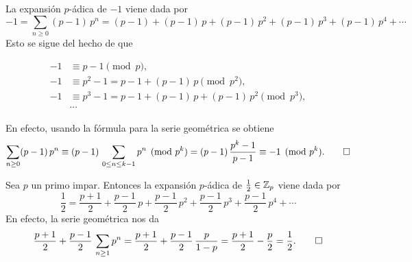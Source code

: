 \documentclass{article}
\numberwithin{equation}{section}
\theoremstyle{definition}
\begin{document}
\begin{ejemplo}
  La expansión $p$-ádica de $-1$ viene dada por
  \[ -1 = \sum_{n\ge 0} (p-1)\,p^n
        = (p-1) + (p-1)\,p + (p-1)\,p^2 + (p-1)\,p^3 + (p-1)\,p^4 + \cdots \]
  Esto se sigue del hecho de que

  \begin{align*}
    -1 & \equiv p-1 \pmod{p},\\
    -1 & \equiv p^2-1 = p-1 + (p-1)\,p \pmod{p^2},\\
    -1 & \equiv p^3-1 = p-1 + (p-1)\,p + (p-1)\,p^2 \pmod{p^3},\\
       & \cdots
  \end{align*}

  En efecto, usando la fórmula para la serie geométrica se obtiene
  \[ \sum_{n\ge 0} (p-1)\,p^n \equiv
     (p-1)\,\sum_{0 \le n \le k-1} p^n \pmod{p^k} =
     (p-1)\,\frac{p^k-1}{p-1} \equiv
     -1 \pmod{p^k}. \qedhere \]
\end{ejemplo}

\begin{ejemplo}
  Sea $p$ un primo impar. Entonces la expansión $p$-ádica de
  $\frac{1}{2} \in \mathbb{Z}_p$ viene dada por
  \[ \frac{1}{2} =
     \frac{p+1}{2} + \frac{p-1}{2}\,p + \frac{p-1}{2}\,p^2 +
     \frac{p-1}{2}\,p^3 + \frac{p-1}{2}\,p^4 + \cdots \]
  En efecto, la serie geométrica nos da
  \[ \frac{p+1}{2} + \frac{p-1}{2} \, \sum_{n\ge 1} p^n =
     \frac{p+1}{2} + \frac{p-1}{2}\,\frac{p}{1 - p} =
     \frac{p+1}{2} - \frac{p}{2} = \frac{1}{2}. \qedhere \]
\end{ejemplo}
\end{document}
